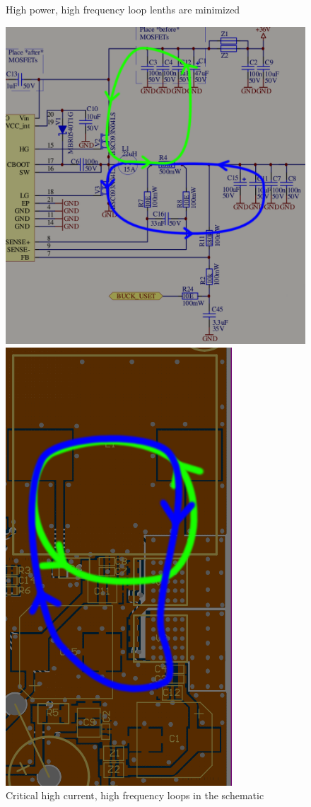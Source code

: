 \begin{figure}[th!]
    \centering
    \caption{High power, high frequency loop lenths are minimized}
    \begin{minipage}{.4\textwidth}
        \centering
        \includegraphics[width=\textwidth]{images/circuit/schematic_high_current.png}
        \caption{Critical high current, high frequency loops in the schematic}
        \label{fig:pcb:loops1}
    \end{minipage}
    \begin{minipage}{.5\textwidth}
        \centering
        \includegraphics[width=.6\textwidth]{images/pcb/buck2.png}

\end{minipage}
\end{figure}
